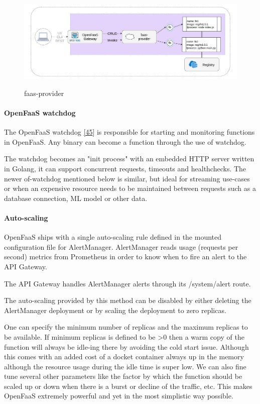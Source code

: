 \documentclass[12pt,titlepage]{article}
\begin{document}
\begin{figure}[!h]
    \caption{faas-provider}
    \centering
    \includegraphics[width=180mm]{./thesis_images/faas-provider.png}
    \label{fig:faas-provider}
\end{figure}

\paragraph{OpenFaaS watchdog}
\label{sec:orga78a983}

The OpenFaaS watchdog \hyperref[ref:45]{[45}] is responsible for starting and monitoring functions in
OpenFaaS. Any binary can become a function through the use of watchdog.

The watchdog becomes an "init process" with an embedded HTTP server written in
Golang, it can support concurrent requests, timeouts and healthchecks. The newer
of-watchdog mentioned below is similar, but ideal for streaming use-cases or
when an expensive resource needs to be maintained between requests such as a
database connection, ML model or other data.

\paragraph{Auto-scaling}
\label{sec:org48aa853}

OpenFaaS ships with a single auto-scaling rule defined in the mounted configuration file for AlertManager. AlertManager reads usage (requests per second) metrics from Prometheus in order to know when to fire an alert to the API Gateway.

The API Gateway handles AlertManager alerts through its /system/alert route.

The auto-scaling provided by this method can be disabled by either deleting the AlertManager deployment or by scaling the deployment to zero replicas.

One can specify the minimum number of replicas and the maximum replicas to be
available. If minimum replicas is defined to be >0 then a warm copy of the
function will always be idle-ing there by avoiding the cold start issue.
Although this comes with an added cost of a docket container always up in the
memory although the resource usage during the idle time is super low. We can
also fine tune several other parameters like the factor by which the function
should be scaled up or down when there is a burst or decline of the traffic,
etc. This makes OpenFaaS extremely powerful and yet in the most simplistic way
possible.
\end{document}
